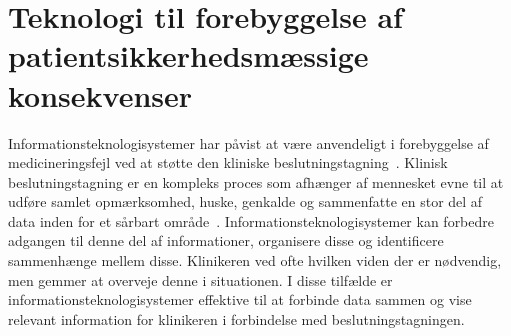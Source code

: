 


\section{Teknologi til forebyggelse af patientsikkerhedsmæssige konsekvenser}
Informationsteknologisystemer har påvist at være anvendeligt i forebyggelse af medicineringsfejl ved at støtte den kliniske beslutningstagning~\citep{Agrawal2009, Anderson2002}. Klinisk beslutningstagning er en kompleks proces som afhænger af mennesket evne til at udføre samlet opmærksomhed, huske, genkalde og sammenfatte en stor del af data inden for et sårbart område~\citep{Agrawal2009}. Informationsteknologisystemer kan forbedre adgangen til denne del af informationer, organisere disse og identificere sammenhænge mellem disse. Klinikeren ved ofte hvilken viden der er nødvendig, men gemmer at overveje denne i situationen. I disse tilfælde er informationsteknologisystemer effektive til at forbinde data sammen og vise relevant information for klinikeren i forbindelse med beslutningstagningen.~\citep{Agrawal2009}

